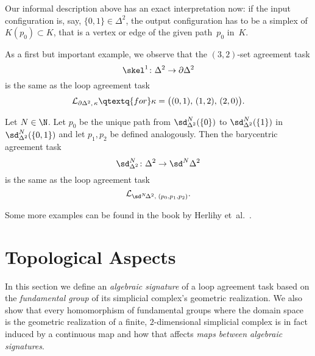 Our informal description above has an exact interpretation now: if the input
configuration is, say, $\{0,1\}\in\Delta^2$, the output configuration has to
be a simplex of $K(p_0)\subset K$, that is a vertex or edge of the given
path~$p_0$ in~$K$.

\begin{thExample}
    \label{ch3:32setagreement}
    As a first but important example, we observe that the
    $(3,2)$-set agreement task 
    \[ \skel^1\colon\Delta^2\to\partial\Delta^2 \]
    is the same as the loop agreement task
    \[ \Loop{\partial\Delta^2,\,\kappa}
        \qtextq{for}
        \kappa = \bigl( (0,1),\, (1,2),\, (2,0) \bigr)
    . \]
\end{thExample}

\begin{thExample}
    \label{ch3:2dimbaryagreement}
    Let $N\in\N$. Let $p_0$ be the unique path from $\sd_{\Delta^2}^N(\{0\})$
    to $\sd_{\Delta^2}^N(\{1\})$ in $\sd_{\Delta^2}^N(\{0,1\})$ and let
    $p_1,p_2$ be defined analogously. Then the barycentric agreement task
    \[ \sd_{\Delta^2}^N\colon \Delta^2 \to \sd^N \Delta^2 \]
    is the same as the loop agreement task
    \[ \Loop{\sd^N\!\Delta^2, \; (p_0,p_1,p_2)}  . \]
\end{thExample}

Some more examples can be found in the book by
Herlihy et~al.~\cite[Sec.~5.6.3]{bookc:herlihyetal13}.

\section{Topological Aspects}
In this section we define an \emph{algebraic signature} of a loop agreement task
based on the \emph{fundamental group} of its simplicial complex's geometric
realization. We also show that every homomorphism of fundamental groups where
the domain space is the geometric realization of a finite, $2$-dimensional
simplicial complex is in fact induced by a continuous map and how that affects
\emph{maps between algebraic signatures}.

